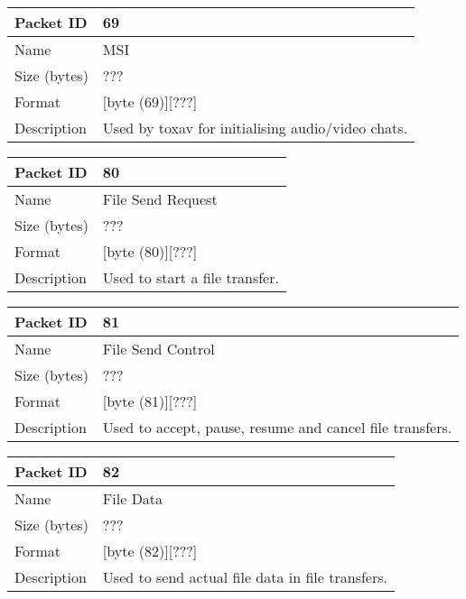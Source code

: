 \documentclass{tox}
\begin{document}
\begin{tabular}[pos]{|l|p{9cm}|}

\hline
Packet ID       &      69
\\ \hline
Name            &      MSI
\\ \hline
Size (bytes)    &      ???
\\ \hline
Format          &      [byte (69)][???]
\\ \hline
Description     &      Used by toxav for initialising audio/video chats.
\\ \hline

\end{tabular}

\begin{tabular}[pos]{|l|p{9cm}|}

\hline
Packet ID       &      80
\\ \hline
Name            &      File Send Request
\\ \hline
Size (bytes)    &      ???
\\ \hline
Format          &      [byte (80)][???]
\\ \hline
Description     &      Used to start a file transfer.
\\ \hline

\end{tabular}

\begin{tabular}[pos]{|l|p{9cm}|}

\hline
Packet ID       &      81
\\ \hline
Name            &      File Send Control
\\ \hline
Size (bytes)    &      ???
\\ \hline
Format          &      [byte (81)][???]
\\ \hline
Description     &      Used to accept, pause, resume and cancel file transfers.
\\ \hline

\end{tabular}

\begin{tabular}[pos]{|l|p{9cm}|}

\hline
Packet ID       &      82
\\ \hline
Name            &      File Data
\\ \hline
Size (bytes)    &      ???
\\ \hline
Format          &      [byte (82)][???]
\\ \hline
Description     &      Used to send actual file data in file transfers.
\\ \hline

\end{tabular}
\end{document}

